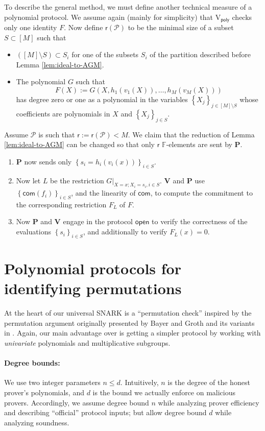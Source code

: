 \documentclass[11pt]{article} %
\newcommand{\F}{\ensuremath{\mathbb F}\xspace}
\newcommand{\com}{\ensuremath{\mathsf{com}}\xspace}
\newcommand{\open}{\ensuremath{\mathsf{open}}\xspace}
\newcommand{\reducedelems}{\ensuremath{\mathsf{r}}\xspace}
\newcommand{\defeq}{:=}
\newcommand{\sett}[2]{\ensuremath{\set{#1}_{#2}}\xspace}
\newcommand{\prv}{\ensuremath{\mathsf{\mathbf{P}}}\xspace}
\newcommand{\verpoly}{\ensuremath{\mathrm{V_{\mathsf{poly}}}}\xspace}
\newcommand{\ver}{\ensuremath{\mathsf{\mathbf{V}}}\xspace}
\newcommand{\set}[1]{\ensuremath{\left\{#1\right\}}\xspace}
\newcommand{\prot}{\ensuremath{\mathscr{P}}\xspace}
\begin{document}
To describe the general method, we must define another technical measure of a polynomial protocol. We assume again (mainly for simplicity) that \verpoly checks only one identity $F$.
Now define $\reducedelems(\prot)$ to be the minimal size of a subset $S\subset [M]$ such that 
\begin{itemize}
 \item $([M]\setminus S)\subset S_i$ for one of the subsets $S_i$ of the partition described before Lemma \ref{lem:ideal-to-AGM}.
 \item The polynomial $G$ such that
 \[F(X)\defeq G(X, h_1(v_1(X)),\ldots,h_{M}(v_{M}(X)))\]
has degree zero or one as a polynomial in the variables \sett{X_j}{j\in [M]\setminus S} whose coefficients are polynomials in $X$ and \sett{X_j}{j\in S}. 
\end{itemize}
Assume \prot is such that $\reducedelems \defeq \reducedelems(\prot)<M$.
We claim that the reduction of Lemma \ref{lem:ideal-to-AGM} can be changed so that only $\reducedelems$ $\F$-elements are sent by \prv.
\begin{enumerate}
 \item \prv now sends only \sett{s_i=h_i(v_i(x))}{i\in S}.
 \item Now let $L$ be the restriction $G|_{X=x;X_i=s_i, i\in S}$. \ver and \prv use \sett{\com(f_i)}{i\in S}, and the linearity of \com, to compute the commitment to the corresponding restriction $F_L$ of $F$.
 \item Now \prv and \ver engage in the protocol \open to verify the correctness of the evaluations $\sett{s_i}{i\in S}$, and additionally to verify $F_L(x)=0$.
 
\end{enumerate}


 


\section{Polynomial protocols for identifying permutations}\label{sec:permprotocol}
At the heart of our universal SNARK is a ``permutation check'' inspired by the permutation argument originally presented by Bayer and Groth \cite{permorig} and its variants in \cite{Bootle,sonic}. Again, our main advantage over \cite{sonic} is getting a simpler protocol by working with \emph{univariate} polynomials and multiplicative subgroups.


\paragraph{Degree bounds:}
 We use two integer parameters $n\leq d$. Intuitively, $n$ is the degree of the honest prover's polynomials, and $d$ is the bound we actually enforce on malicious provers. Accordingly, we assume degree bound $n$ while analyzing prover efficiency and describing ``official'' protocol inputs; but allow degree bound $d$ while analyzing soundness.
\end{document}
